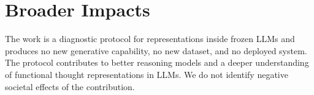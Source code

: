 \section{Broader Impacts}
\label{appendix:impact}

The work is a diagnostic protocol for representations inside frozen LLMs and produces no new generative capability, no new dataset, and no deployed system. The protocol contributes to better reasoning models and a deeper understanding of functional thought representations in LLMs. We do not identify negative societal effects of the contribution.
